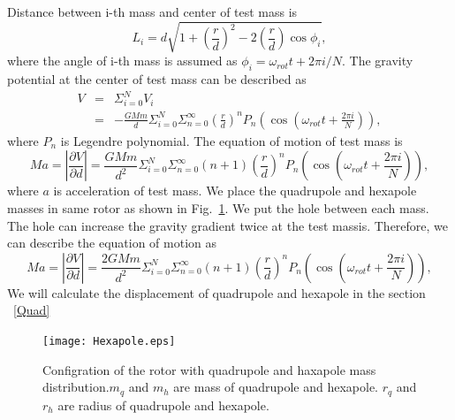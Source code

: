 \documentclass[12pt]{iopart}
\begin{document}
Distance between i-th mass and center of test mass is 
\begin{equation}
L_i=d \sqrt{1+\left( \frac{r}{d} \right)^2 -2\left( \frac{r}{d} \right) \cos{\phi_i} },
\end{equation}
where the angle of i-th mass is assumed as $\phi_i=\omega_{rot} t + 2\pi i/N$.
The gravity potential at the center of test mass can be described as
\begin{eqnarray}
V &=& \Sigma^N_{i=0} V_i \\
&=&-\frac{GMm}{d} \Sigma^N_{i=0} \Sigma^{\infty}_{n=0} \left( \frac{r}{d} \right)^n P_n\left(\cos{\left(\omega_{rot} t +\frac{2 \pi i}{N}\right)}\right),
\end{eqnarray}
where $P_n$ is Legendre polynomial. The equation of motion of test mass is 
\begin{equation}
Ma=\left| \frac{\partial V}{\partial{d}} \right| =\frac{GMm}{d^2}\Sigma^N_{i=0} \Sigma^{\infty}_{n=0}(n+1) \left( \frac{r}{d} \right)^n P_n\left(\cos{\left(\omega_{rot} t +\frac{2 \pi i}{N}\right)}\right),
\end{equation}
where $a$ is acceleration of test mass. We place the quadrupole and hexapole masses in same rotor as shown in Fig.~\ref{fig:hex}. We put the hole between each mass. The hole can increase the gravity gradient twice at the test massis. Therefore, we can describe the equation of motion as 
\begin{equation}
Ma=\left| \frac{\partial V}{\partial{d}} \right| =\frac{2GMm}{d^2}\Sigma^N_{i=0} \Sigma^{\infty}_{n=0}(n+1) \left( \frac{r}{d} \right)^n P_n\left(\cos{\left(\omega_{rot} t +\frac{2 \pi i}{N}\right)}\right),
\end{equation}
We will calculate the displacement of quadrupole and hexapole in the section ~\ref{Quad} 

\begin{figure}
\begin{center}
\texttt{[image: Hexapole.eps]}
\caption{Configration of the rotor with quadrupole and haxapole mass distribution.$m_q$ and $m_h$ are mass of quadrupole and hexapole. $r_q$ and $r_h$ are radius of quadrupole and hexapole.}
\label{fig:hex}
\end{center}
\end{figure}
\end{document}
